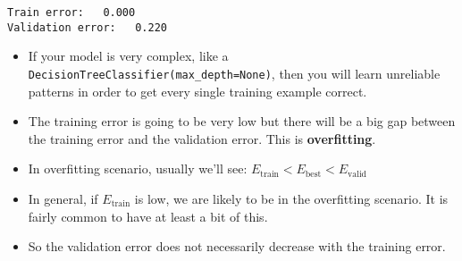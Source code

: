 \documentclass[11pt]{article}
\providecommand{\tightlist}{%
      \setlength{\itemsep}{0pt}\setlength{\parskip}{0pt}}
\def\lt{<}
\begin{document}
    \begin{Verbatim}[commandchars=\\\{\}]
Train error:   0.000
Validation error:   0.220
    \end{Verbatim}

    \begin{itemize}
\tightlist
\item
  If your model is very complex, like a
  \texttt{DecisionTreeClassifier(max\_depth=None)}, then you will learn
  unreliable patterns in order to get every single training example
  correct.
\item
  The training error is going to be very low but there will be a big gap
  between the training error and the validation error. This is
  \textbf{overfitting}.
\item
  In overfitting scenario, usually we'll see:
  \(E_\textrm{train} \lt E_\textrm{best}  \lt E_\textrm{valid}\)
\item
  In general, if \(E_\textrm{train}\) is low, we are likely to be in the
  overfitting scenario. It is fairly common to have at least a bit of
  this.
\end{itemize}

    \begin{itemize}
\tightlist
\item
  So the validation error does not necessarily decrease with the
  training error.
\end{itemize}
\end{document}
